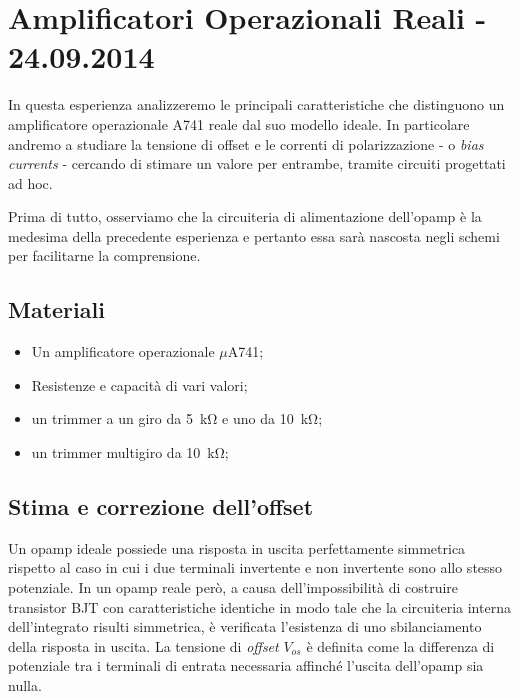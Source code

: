 \section{Amplificatori Operazionali Reali - 24.09.2014}

In questa esperienza analizzeremo le principali caratteristiche che distinguono un amplificatore operazionale \si{\micro}A741 reale dal suo modello ideale.
In particolare andremo a studiare la tensione di offset e le correnti di polarizzazione - o \textit{bias currents} - cercando di stimare un valore per entrambe, tramite circuiti progettati ad hoc.

Prima di tutto, osserviamo che la circuiteria di alimentazione dell'opamp è la medesima della precedente esperienza e pertanto essa sarà nascosta negli schemi per facilitarne la comprensione.

\subsection*{Materiali}

\begin{itemize} [noitemsep]
\item Un amplificatore operazionale $\mu$A741;
\item Resistenze e capacità di vari valori;
\item un trimmer a un giro da \SI{5}{\kilo\ohm} e uno da \SI{10}{\kilo\ohm};
\item un trimmer multigiro da \SI{10}{\kilo\ohm};
\end{itemize}

\subsection{Stima e correzione dell'offset}
\label{par2:offset}

Un opamp ideale possiede una risposta in uscita perfettamente simmetrica rispetto al caso in cui i due terminali invertente e non invertente sono allo stesso potenziale.
In un opamp reale però, a causa dell'impossibilità di costruire transistor BJT con caratteristiche identiche in modo tale che la circuiteria interna dell'integrato risulti simmetrica, è verificata l'esistenza di uno sbilanciamento della risposta in uscita.
La tensione di \textit{offset} $V_{os}$ è definita come la differenza di potenziale tra i terminali di entrata necessaria affinché l'uscita dell'opamp sia nulla.

